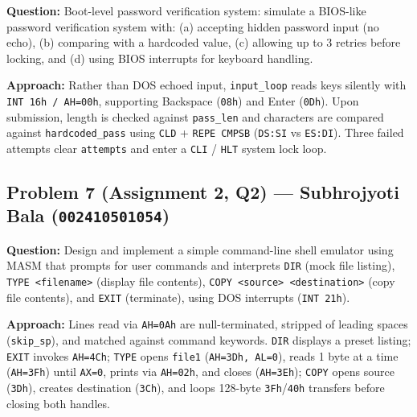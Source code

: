 \documentclass[11pt,a4paper]{article}
\begin{document}
\textbf{Question:} Boot-level password verification system: simulate a BIOS-like password verification system with: (a) accepting hidden password input (no echo), (b) comparing with a hardcoded value, (c) allowing up to 3 retries before locking, and (d) using BIOS interrupts for keyboard handling.

\textbf{Approach:} Rather than DOS echoed input, \texttt{input\_loop} reads keys silently with \texttt{INT 16h / AH=00h}, supporting Backspace (\texttt{08h}) and Enter (\texttt{0Dh}). Upon submission, length is checked against \texttt{pass\_len} and characters are compared against \texttt{hardcoded\_pass} using \texttt{CLD} + \texttt{REPE CMPSB} (\texttt{DS:SI} vs \texttt{ES:DI}). Three failed attempts clear \texttt{attempts} and enter a \texttt{CLI} / \texttt{HLT} system lock loop.



\subsection{Problem 7 (Assignment 2, Q2) --- Subhrojyoti Bala (\texttt{002410501054})}

\textbf{Question:} Design and implement a simple command-line shell emulator using MASM that prompts for user commands and interprets \texttt{DIR} (mock file listing), \texttt{TYPE <filename>} (display file contents), \texttt{COPY <source> <destination>} (copy file contents), and \texttt{EXIT} (terminate), using DOS interrupts (\texttt{INT 21h}).

\textbf{Approach:} Lines read via \texttt{AH=0Ah} are null-terminated, stripped of leading spaces (\texttt{skip\_sp}), and matched against command keywords. \texttt{DIR} displays a preset listing; \texttt{EXIT} invokes \texttt{AH=4Ch}; \texttt{TYPE} opens \texttt{file1} (\texttt{AH=3Dh, AL=0}), reads 1 byte at a time (\texttt{AH=3Fh}) until \texttt{AX=0}, prints via \texttt{AH=02h}, and closes (\texttt{AH=3Eh}); \texttt{COPY} opens source (\texttt{3Dh}), creates destination (\texttt{3Ch}), and loops 128-byte \texttt{3Fh}/\texttt{40h} transfers before closing both handles.


\end{document}
